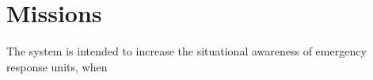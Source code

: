 \section{Missions}
The system is intended to increase the situational awareness of emergency response units, when 